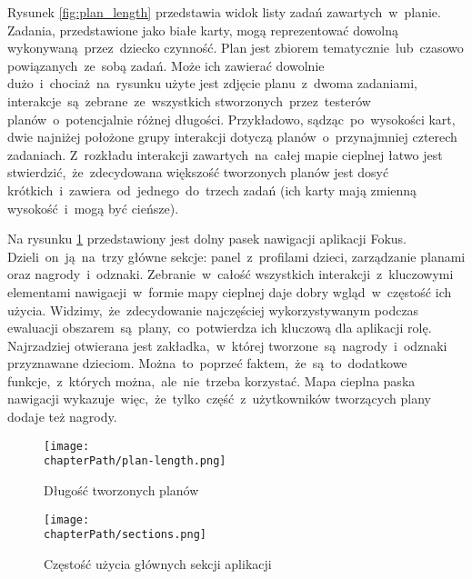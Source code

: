 Rysunek \ref{fig:plan_length} przedstawia widok listy zadań zawartych~w~planie. Zadania, przedstawione jako białe karty, mogą reprezentować dowolną wykonywaną~przez~dziecko czynność. Plan jest zbiorem tematycznie~lub~czasowo powiązanych~ze~sobą zadań. Może ich zawierać dowolnie dużo~i~chociaż~na~rysunku użyte jest zdjęcie planu~z~dwoma zadaniami, interakcje~są~zebrane~ze~wszystkich stworzonych~przez~testerów planów~o~potencjalnie różnej długości. Przykładowo, sądząc~po~wysokości kart, dwie najniżej położone grupy interakcji dotyczą planów~o~przynajmniej czterech zadaniach. Z~rozkładu interakcji zawartych~na~całej mapie cieplnej łatwo jest stwierdzić,~że~zdecydowana większość tworzonych planów jest dosyć krótkich~i~zawiera~od~jednego~do~trzech zadań (ich karty mają zmienną wysokość~i~mogą być cieńsze).

Na rysunku \ref{fig:sections_usage} przedstawiony jest dolny pasek nawigacji aplikacji Fokus. Dzieli~on~ją~na~trzy główne sekcje: panel~z~profilami dzieci, zarządzanie planami oraz nagrody~i~odznaki. Zebranie~w~całość wszystkich interakcji~z~kluczowymi elementami nawigacji~w~formie mapy cieplnej daje dobry wgląd~w~częstość ich użycia. Widzimy,~że~zdecydowanie najczęściej wykorzystywanym podczas ewaluacji obszarem~są~plany,~co~potwierdza ich kluczową dla aplikacji rolę. Najrzadziej otwierana jest zakładka,~w~której tworzone~są~nagrody~i~odznaki przyznawane dzieciom. Można~to~poprzeć faktem,~że~są~to~dodatkowe funkcje,~z~których można,~ale~nie~trzeba korzystać. Mapa cieplna paska nawigacji wykazuje~więc,~że~tylko~część~z~użytkowników tworzących plany dodaje też nagrody.

\bigskip
\begin{figure}[H]
\centering
\begin{minipage}{.4\textwidth}
	\centering
	\texttt{[image: \\chapterPath/plan-length.png]}
	\bigskip
	\caption{Długość tworzonych planów}
	\label{fig:plan_length}
\end{minipage}
\begin{minipage}{.55\textwidth}
	\centering
	\texttt{[image: \\chapterPath/sections.png]}
	\bigskip
	\caption{Częstość użycia głównych sekcji aplikacji}
	\label{fig:sections_usage}
\end{minipage}
\end{figure}
